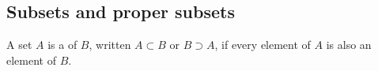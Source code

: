 \subsection *{Subsets and proper subsets}





\begin{defn}\label{definition:sets:subset}
A set $A$ is a  of $B$, written $A \subset B$\label{setcontain} or $B \supset A$, if every element of $A$ is also an element of $B$.  
\end{defn}


